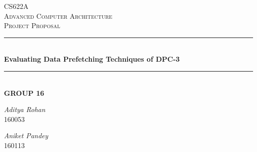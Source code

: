 \documentclass[12pt]{article}
\begin{document}
\begin{titlepage}
\newcommand{\HRule}{\rule{\linewidth}{0.1mm}} 
\center %
 
\textsc{\Large CS622A}\\[0.4cm] %
\textsc{\Large Advanced Computer Architecture}\\[0.4cm] %
\textsc{\large Project Proposal }\\[0.4cm] %

\HRule \\[0.4cm]
{ \Large \bfseries Evaluating Data Prefetching Techniques of DPC-3}\\[0.1cm] %
\HRule \\[0.5cm]
{ \large \bfseries GROUP 16}\\[1cm]
 

\begin{minipage}{0.4\textwidth}
\begin{flushleft} \large

\emph{Aditya Rohan}\\160053  %
\end{flushleft}
\begin{flushleft} \large

\emph{Aniket Pandey}\\160113  %
\end{flushleft}



\end{minipage}
\end{titlepage}
\end{document}
